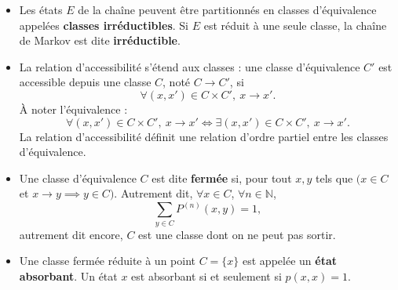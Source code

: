 \begin{definition}[7.3]
\begin{itemize}
    \item Les états $E$ de la chaîne peuvent être partitionnés en classes d’équivalence appelées \textbf{classes irréductibles}. Si $E$ est réduit à une seule classe, la chaîne de Markov est dite \textbf{irréductible}.

    \item La relation d’accessibilité s’étend aux classes : une classe d’équivalence $C'$ est accessible depuis une classe $C$, noté $C \to C'$, si 
    \[
    \forall (x, x') \in C \times C',\ x \to x'.
    \]
    À noter l’équivalence :
    \[
    \forall (x, x') \in C \times C',\ x \to x' \iff \exists (x, x') \in C \times C',\ x \to x'.
    \]
    La relation d’accessibilité définit une relation d’ordre partiel entre les classes d’équivalence.

    \item Une classe d’équivalence $C$ est dite \textbf{fermée} si, pour tout $x, y$ tels que $(x \in C$ et $x \to y \implies y \in C)$. Autrement dit, $\forall x \in C$, $\forall n \in \mathbb{N}$, 
    \[
    \sum_{y \in C} P^{(n)}(x, y) = 1,
    \]
    autrement dit encore, $C$ est une classe dont on ne peut pas sortir.

    \item Une classe fermée réduite à un point $C = \{x\}$ est appelée un \textbf{état absorbant}. Un état $x$ est absorbant si et seulement si $p(x, x) = 1$.
\end{itemize}
\end{definition}

